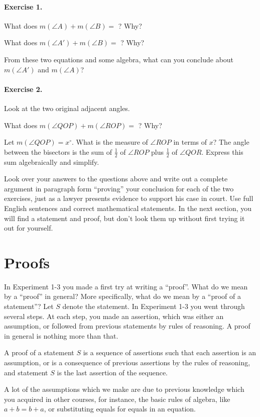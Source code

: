 \documentclass[12pt]{book} %
\begin{document}
\paragraph{Exercise 1.}
What does $m(\angle A)+m(\angle B)=$ ? Why?

What does $m(\angle A')+m(\angle B)=$ ? Why?

From these two equations and some algebra, what can you conclude about $m(\angle A')$ and $m(\angle A)$?

\paragraph{Exercise 2.}
Look at the two original adjacent angles.

What does $m(\angle QOP)+m(\angle ROP)=$ ? Why?

Let $m(\angle QOP)=x^\circ$. What is the measure of $\angle ROP$ in terms of $x$? The angle between the bisectors is the sum of $\frac12$ of $\angle ROP$ plus $\frac12$ of $\angle QOR$. Express this sum algebraically and simplify.

Look over your answers to the questions above and write out a complete argument in paragraph form ``proving'' your conclusion for each of the two exercises, just as a lawyer presents evidence to support his case in court. Use full English sentences and correct mathematical statements. In the next section, you will find a statement and proof, but don't look them up without first trying it out for yourself.

\section{Proofs}

In Experiment 1-3 you made a first try at writing a ``proof''. What do we mean by a ``proof'' in general? More specifically, what do we mean by a ``proof of a statement''? Let $S$ denote the statement. In Experiment 1-3 you went through several steps. At each step, you made an assertion, which was either an assumption, or followed from previous statements by rules of reasoning. A proof in general is nothing more than that.

A proof of a statement $S$ is a sequence of assertions such that each assertion is an assumption, or is a consequence of previous assertions by the rules of reasoning, and statement $S$ is the last assertion of the sequence.

A lot of the assumptions which we make are due to previous knowledge which you acquired in other courses, for instance, the basic rules of algebra, like $a+b=b+a$, or substituting equals for equals in an equation.
\end{document}
